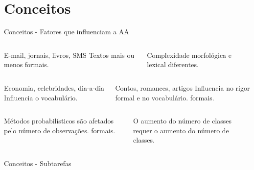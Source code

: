 \section{Conceitos}

\begin{frame}{Conceitos - Fatores que influenciam a AA}

\begin{columns}
	\begin{column}{0.48\textwidth}
		\begin{tcolorbox}[title=Canal,height=2.4cm,valign=center]
			E-mail, jornais, livros, SMS
			\tcblower
			Textos mais ou menos formais.                    
		\end{tcolorbox}
	\end{column}
	\begin{column}{0.48\textwidth}
		\begin{tcolorbox}[title=Idioma,height=2.4cm,valign=center]
			Complexidade morfológica e lexical diferentes.
		\end{tcolorbox}
	\end{column}
\end{columns}
\begin{columns}
	\begin{column}{0.48\textwidth}
		\begin{tcolorbox}[title=Tópico,height=2.4cm,valign=center]
			Economia, celebridades, dia-a-dia
			\tcblower
			Influencia o vocabulário.                    
		\end{tcolorbox}
	\end{column}
	\begin{column}{0.48\textwidth}
		\begin{tcolorbox}[title=Domínio ou Gênero do texto,height=2.4cm,valign=center]
			Contos, romances, artigos
			\tcblower
			Influencia no rigor formal e no vocabulário. formais.                    
		\end{tcolorbox}
	\end{column}
\end{columns}

\begin{columns}
	\begin{column}{0.48\textwidth}
	\begin{tcolorbox}[title=Tamanho do texto,height=2.4cm,valign=center]
		Métodos probabilísticos são afetados pelo número de observações. formais.                    
	\end{tcolorbox}
	\end{column}
	\begin{column}{0.48\textwidth}
	\begin{tcolorbox}[title=Número de autores,height=2.4cm,valign=center]
	O aumento do número de classes requer o aumento do número de classes.                    
	\end{tcolorbox}
	\end{column}
\end{columns}

\end{frame}






\begin{frame}{Conceitos - Subtarefas}
\end{frame}
